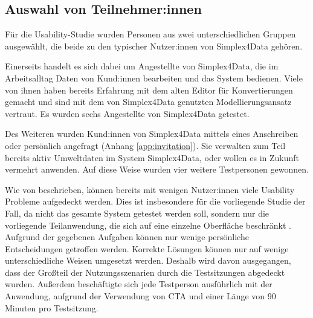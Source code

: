 \subsection{Auswahl von Teilnehmer:innen}

Für die Usability-Studie wurden Personen aus zwei unterschiedlichen Gruppen ausgewählt, die beide zu den typischer Nutzer:innen von Simplex4Data gehören.

Einerseits handelt es sich dabei um Angestellte von Simplex4Data, die im Arbeitsalltag Daten von Kund:innen bearbeiten und das System bedienen. Viele von ihnen haben bereits Erfahrung mit dem alten Editor für Konvertierungen gemacht und sind mit dem von Simplex4Data genutzten Modellierungsansatz vertraut. Es wurden sechs Angestellte von Simplex4Data getestet.

Des Weiteren wurden Kund:innen von Simplex4Data mittels eines Anschreiben oder persönlich angefragt (Anhang \ref{app:invitation}). Sie verwalten zum Teil bereits aktiv Umweltdaten im System Simplex4Data, oder wollen es in Zukunft vermehrt anwenden. Auf diese Weise wurden vier weitere Testpersonen gewonnen.

Wie von \textcite{nielsenWhyYou2000} beschrieben, können bereits mit wenigen Nutzer:innen viele Usability Probleme aufgedeckt werden. Dies ist insbesondere für die vorliegende Studie der Fall, da nicht das gesamte System getestet werden soll, sondern nur die vorliegende Teilanwendung, die sich auf eine einzelne Oberfläche beschränkt \parencite{spoolTestingWeb2001}. Aufgrund der gegebenen Aufgaben können nur wenige persönliche Entscheidungen getroffen werden. Korrekte Lösungen können nur auf wenige unterschiedliche Weisen umgesetzt werden. Deshalb wird davon ausgegangen, dass der Großteil der Nutzungsszenarien durch die Testsitzungen abgedeckt wurden. Außerdem beschäftigte sich jede Testperson ausführlich mit der Anwendung, aufgrund der Verwendung von \ac{CTA} und einer Länge von 90 Minuten pro Testsitzung.
